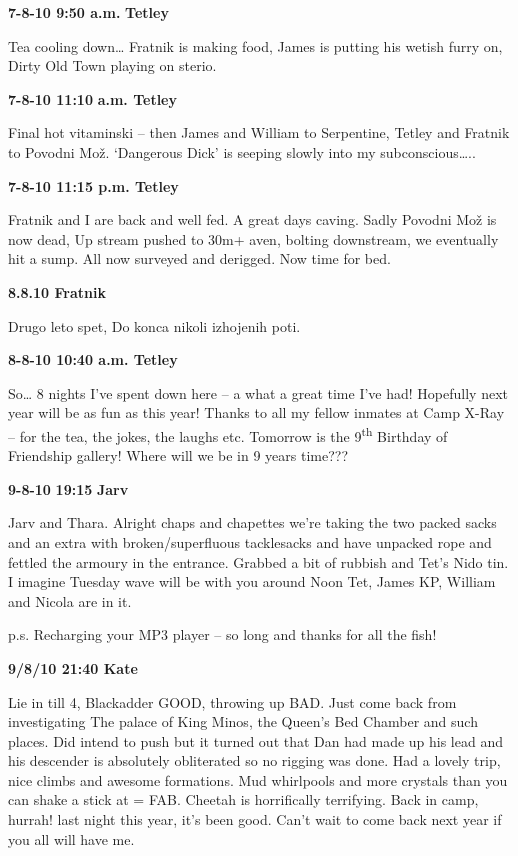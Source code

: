 \textbf{7-8-10 9:50 a.m.} \textbf{Tetley}

Tea cooling down\ldots{} Fratnik is making food, James is putting his
wetish furry on, Dirty Old Town playing on sterio.

\textbf{7-8-10 11:10} \textbf{a.m. Tetley}

Final hot vitaminski -- then James and William to Serpentine, Tetley and
Fratnik to Povodni Mož. `Dangerous Dick' is seeping slowly into my
subconscious\ldots{}..

\textbf{7-8-10 11:15 p.m. Tetley}

Fratnik and I are back and well fed. A great days caving. Sadly Povodni
Mož is now dead, Up stream pushed to 30m+ aven, bolting downstream, we
eventually hit a sump. All now surveyed and derigged. Now time for bed.

\textbf{8.8.10 Fratnik}

Drugo leto spet, Do konca nikoli izhojenih poti.

\textbf{8-8-10 10:40 a.m. Tetley}

So\ldots{} 8 nights I've spent down here -- a what a great time I've
had! Hopefully next year will be as fun as this year! Thanks to all my
fellow inmates at Camp X-Ray -- for the tea, the jokes, the laughs etc.
Tomorrow is the 9\textsuperscript{th} Birthday of Friendship gallery!
Where will we be in 9 years time???

\textbf{9-8-10} \textbf{19:15} \textbf{Jarv}

Jarv and Thara. Alright chaps and chapettes we're taking the two packed
sacks and an extra with broken/superfluous tacklesacks and have unpacked
rope and fettled the armoury in the entrance. Grabbed a bit of rubbish
and Tet's Nido tin. I imagine Tuesday wave will be with you around Noon
Tet, James KP, William and Nicola are in it.

p.s. Recharging your MP3 player -- so long and thanks for all the fish!

\textbf{9/8/10 21:40 Kate}

Lie in till 4, Blackadder GOOD, throwing up BAD. Just come back from
investigating The palace of King Minos, the Queen's Bed Chamber and such
places. Did intend to push but it turned out that Dan had made up his
lead and his descender is absolutely obliterated so no rigging was done.
Had a lovely trip, nice climbs and awesome formations. Mud whirlpools
and more crystals than you can shake a stick at = FAB. Cheetah is
horrifically terrifying. Back in camp, hurrah! last night this year,
it's been good. Can't wait to come back next year if you all will have
me.

